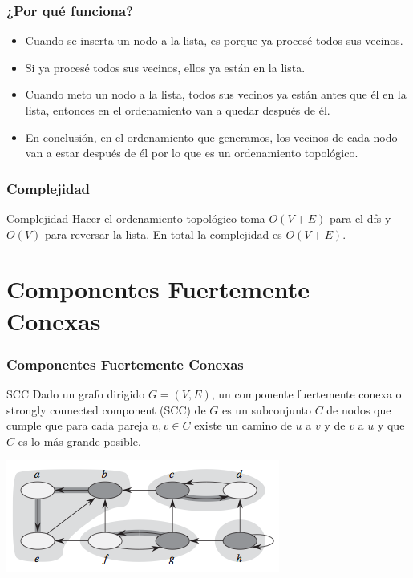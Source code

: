 \documentclass{beamer}
\begin{document}
	\begin{frame}
		\frametitle{¿Por qué funciona?}
		\begin{itemize}
			\item Cuando se inserta un nodo a la lista, es porque ya procesé todos sus vecinos.
			\item Si ya procesé todos sus vecinos, ellos ya están en la lista.
			\item Cuando meto un nodo a la lista, todos sus vecinos ya están antes que él en la lista, entonces en el ordenamiento van a quedar después de él.
			\item En conclusión, en el ordenamiento que generamos, los vecinos de cada nodo van a estar después de él por lo que es un ordenamiento topológico.
		\end{itemize}
	\end{frame}
	
	\begin{frame}
		\frametitle{Complejidad}
		\begin{block}{Complejidad}
			Hacer el ordenamiento topológico toma $O(V+E)$ para el dfs y $O(V)$ para reversar la lista. En total la complejidad es $O(V+E)$.
		\end{block}
	\end{frame}


\section{Componentes Fuertemente Conexas}
	\begin{frame}
		\frametitle{Componentes Fuertemente Conexas}
		\begin{block}{SCC}
			Dado un grafo dirigido $G = (V, E)$, un componente fuertemente conexa o strongly connected component (SCC) de $G$ es un subconjunto $C$ de nodos que cumple que para cada pareja $u, v \in C$ existe un camino de $u$ a $v$ y de $v$ a $u$ y que $C$ es lo más grande posible. 
		\end{block}
		\begin{center} \includegraphics[height = 0.3\textheight]{scc.png} \end{center}
	\end{frame}
	
\end{document}
